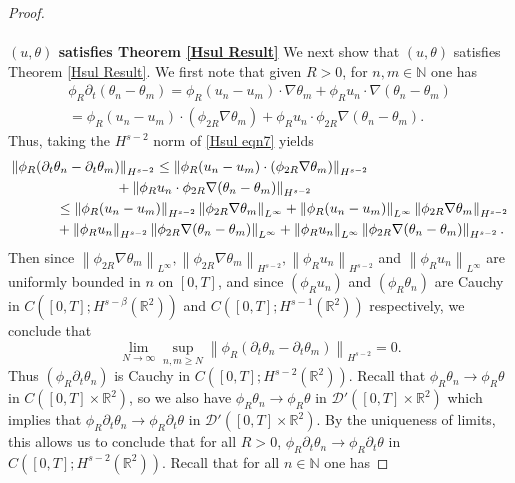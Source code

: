 \documentclass[12pt,xcolor=svgnames]{amsart}
\newcommand{\R}{\mathbb{R}}
\newcommand{\norm}[2]{\left\lVert#1\right\rVert_{#2}}
\begin{document}
\begin{proof}
\\
\\
\textbf{$(u,\theta)$ satisfies Theorem \ref{Hsul Result} }
We next show that $(u,\theta)$ satisfies Theorem \ref{Hsul Result}. We first note that given $R>0$, for $n,m\in \mathbb{N}$ one has 
\begin{multline}
\label{Hsul eqn7}
\phi_R\partial_t(\theta_n-\theta_m) = \phi_R(u_n-u_m)\cdot \nabla \theta_m + \phi_Ru_n\cdot \nabla (\theta_n-\theta_m)\\
= \phi_R(u_n-u_m)\cdot(\phi_{2R}\nabla \theta_m) + \phi_Ru_n\cdot \phi_{2R}\nabla(\theta_n-\theta_m).
\end{multline}
Thus, taking the $H^{s-2}$ norm of \eqref{Hsul eqn7} yields
\begin{align*}
\norm{\phi_R(\partial_t\theta_n-\partial_t\theta_m)}{H^{s-2}} &\leq \norm{\phi_R(u_n-u_m)\cdot(\phi_{2R}\nabla \theta_m)}{H^{s-2}}\\ &\hspace{-1cm}+ \norm{\phi_Ru_n\cdot \phi_{2R}\nabla(\theta_n-\theta_m)}{H^{s-2}}\\
&\hspace{-2.5cm}\leq 
\norm{\phi_R(u_n-u_m)}{H^{s-2}}\norm{\phi_{2R}\nabla\theta_m}{L^{\infty}}+\norm{\phi_R(u_n-u_m)}{L^{\infty}}\norm{\phi_{2R}\nabla\theta_m}{H^{s-2}}\\
&\hspace{-2.5cm}+\norm{\phi_Ru_n}{H^{s-2}}\norm{\phi_{2R}\nabla(\theta_n-\theta_m)}{L^{\infty}}+\norm{\phi_Ru_n}{L^{\infty}}\norm{\phi_{2R}\nabla(\theta_n-\theta_m)}{H^{s-2}}.
\end{align*}
Then since $\norm{\phi_{2R}\nabla\theta_m}{L^{\infty}}, \norm{\phi_{2R}\nabla\theta_m}{H^{s-2}}, \norm{\phi_Ru_n}{H^{s-2}}$ and $\norm{\phi_Ru_n}{L^{\infty}}$ are uniformly bounded in $n$ on $[0,T]$, and since $(\phi_Ru_n)$ and $(\phi_R\theta_n)$ are Cauchy in $C([0,T];H^{s-\beta}(\R^2))$  and $C([0,T];H^{s-1}(\R^2))$ respectively, we conclude that 
\begin{equation}
\label{Hsul eqn8}
\lim_{N\to \infty} \sup_{n,m\geq N} \norm{\phi_R(\partial_t\theta_n-\partial_t\theta_m)}{H^{s-2}}=0.
\end{equation}
Thus $(\phi_{R}\partial_t\theta_n)$ is Cauchy in $C([0,T];H^{s-2}(\R^2))$. Recall that $\phi_R\theta_n \to \phi_R\theta$ in $C([0,T]\times \R^2)$, so we also have $\phi_{R}\theta_n \to \phi_R\theta$ in $\mathcal{D}'([0,T]\times \R^2)$ which implies that $\phi_{R}\partial_t\theta_n \to \phi_{R}\partial_t\theta$ in $\mathcal{D}'([0,T]\times \R^2)$. By the uniqueness of limits, this allows us to conclude that for all $R>0$, $\phi_{R}\partial_t\theta_n \to \phi_{R}\partial_t\theta$ in $C([0,T];H^{s-2}(\R^2))$. Recall that for all $n\in \mathbb{N}$ one has 

\end{proof}
\end{document}
